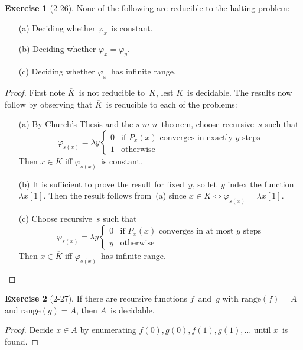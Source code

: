 \documentclass[letterpaper]{article}
\newcommand{\ran}{\mathrm{range}}
\newcommand{\comp}[1]{\overline{#1}}
\newcommand{\smn}{$s$-$m$-$n$}
\theoremstyle{definition}
\newtheorem*{exer}{Exercise}
\theoremstyle{remark}
\theoremstyle{direction}
\begin{document}
\begin{exer}[2-26]
None of the following are reducible to the halting problem:
\begin{enumerate}[itemsep=0pt]
\item[(a)] Deciding whether $\varphi_x$~is constant.
\item[(b)] Deciding whether $\varphi_x=\varphi_y$.
\item[(c)] Deciding whether $\varphi_x$~has infinite range.
\end{enumerate}
\end{exer}
\begin{proof}
First note $\comp{K}$~is not reducible to~$K$, lest $K$~is decidable. The results now follow by observing that $\comp{K}$~is reducible to each of the problems:
\begin{enumerate}[itemsep=0pt]
\item[(a)] By Church's Thesis and the \smn\ theorem, choose recursive~$s$ such that
$$\varphi_{s(x)}=\lambda y\begin{cases}
0&\text{if }P_x(x)\text{ converges in exactly }y\text{ steps}\\
1&\text{otherwise}
\end{cases}$$
Then $x\in\comp{K}$ iff $\varphi_{s(x)}$~is constant.
\item[(b)] It is sufficient to prove the result for fixed~$y$, so let~$y$ index the function $\lambda x[1]$. Then the result follows from~(a) since $x\in\comp{K}\iff\varphi_{s(x)}=\lambda x[1]$.
\item[(c)] Choose recursive~$s$ such that
$$\varphi_{s(x)}=\lambda y\begin{cases}
0&\text{if }P_x(x)\text{ converges in at most }y\text{ steps}\\
y&\text{otherwise}
\end{cases}$$
Then $x\in\comp{K}$ iff $\varphi_{s(x)}$~has infinite range.\qedhere
\end{enumerate}
\end{proof}

\begin{exer}[2-27]
If there are recursive functions $f$~and~$g$ with $\ran(f)=A$ and $\ran(g)=\comp{A}$, then $A$~is decidable.
\end{exer}
\begin{proof}
Decide $x\in A$ by enumerating $f(0),g(0),f(1),g(1),\ldots$ until $x$~is found.
\end{proof}
\end{document}
